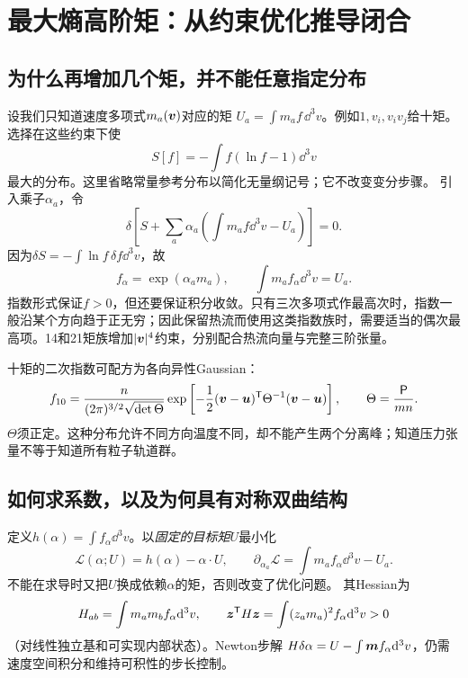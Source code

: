 \section{最大熵高阶矩：从约束优化推导闭合}
\subsection{为什么再增加几个矩，并不能任意指定分布}
设我们只知道速度多项式$m_a(\bm{v})$对应的矩
$U_a=\int m_af\,\dd^3v$。例如$1,v_i,v_iv_j$给十矩。选择在这些约束下使
\begin{equation}
 S[f]=-\int f(\ln f-1)\dd^3v
\end{equation}
最大的分布。这里省略常量参考分布以简化无量纲记号；它不改变变分步骤。
引入乘子$\alpha_a$，令
\begin{equation}
 \delta\left[S+\sum_a\alpha_a\left(\int m_af\dd^3v-U_a\right)\right]=0.
\end{equation}
因为$\delta S=-\int\ln f\,\delta f\dd^3v$，故
\begin{equation}
 f_\alpha=\exp(\alpha_am_a),\qquad
 \int m_af_\alpha\dd^3v=U_a.
 \label{eq:selected-maxent}
\end{equation}
指数形式保证$f>0$，但还要保证积分收敛。只有三次多项式作最高次时，指数一般沿某个方向趋于正无穷；因此保留热流而使用这类指数族时，需要适当的偶次最高项。14和21矩族增加$|\bm{v}|^4$约束，分别配合热流向量与完整三阶张量。\citep{E553}

十矩的二次指数可配方为各向异性Gaussian：
\begin{equation}
 f_{10}={n\over(2\pi)^{3/2}\sqrt{\det\Theta}}
 \exp\left[-{1\over2}(\bm{v}-\bm{u})^{\mathsf T}\Theta^{-1}(\bm{v}-\bm{u})\right],
 \qquad\Theta={\mathsf P\over mn}.
\end{equation}
$\Theta$须正定。这种分布允许不同方向温度不同，却不能产生两个分离峰；知道压力张量不等于知道所有粒子轨道群。

\subsection{如何求系数，以及为何具有对称双曲结构}
定义$h(\alpha)=\int f_\alpha\dd^3v$。以\emph{固定的目标矩}$U$最小化
\begin{equation}
 \mathcal L(\alpha;U)=h(\alpha)-\alpha\cdot U,\qquad
 \partial_{\alpha_a}\mathcal L=\int m_af_\alpha\dd^3v-U_a.
\end{equation}
不能在求导时又把$U$换成依赖$\alpha$的矩，否则改变了优化问题。
其Hessian为
\begin{equation}
 H_{ab}=\int m_am_bf_\alpha\mathrm d^3v,\qquad
 \bm{z}^{\mathsf T}H\bm{z}=\int(z_am_a)^2f_\alpha\mathrm d^3v>0
\end{equation}
（对线性独立基和可实现内部状态）。Newton步解
$H\delta\alpha=U-\int\bm{m}f_\alpha\mathrm d^3v$，仍需速度空间积分和维持可积性的步长控制。

